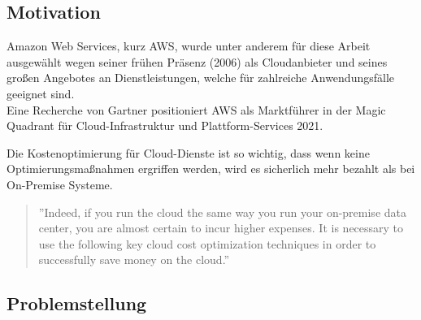 \subsection{Motivation}
Amazon Web Services, kurz AWS, wurde unter anderem für diese Arbeit ausgewählt wegen seiner frühen Präsenz (2006) als Cloudanbieter und seines großen Angebotes an Dienstleistungen, welche für zahlreiche Anwendungsfälle geeignet sind.
\\
Eine Recherche von Gartner positioniert AWS als Marktführer in der Magic Quadrant für Cloud-Infrastruktur und Plattform-Services 2021.
{\cite{G01}}
\begin{comment} GELÖSCHT, WEIL DIESE EINE BEHAUPTUNG IST (25.10.2021)
\\\\
Für viele Unternehmen ist eine große Herausforderung, die Kosten von Cloud-Diensten übersichtlich zu halten und Optimierungsmöglichkeit leicht zu erkennen. Zusätzlich besteht die Gefahr, unangenehme Überraschungen in einer Rechnung zu bekommen, weil keine Grenze für den Konsum von Cloud-Diensten festgelegt wurde. 
\end{comment}

Die Kostenoptimierung für Cloud-Dienste ist so wichtig, dass wenn keine Optimierungsmaßnahmen ergriffen werden, wird es sicherlich mehr bezahlt als bei On-Premise Systeme.
\\
\begin{quote}
    ”Indeed, if you run the cloud the same way you run your on-premise data center, you are almost certain to incur higher expenses. It is necessary to use the following key cloud cost optimization techniques in order to successfully save money on the cloud.”
{\cite{CCB}}
\end{quote}

\subsection{Problemstellung}

